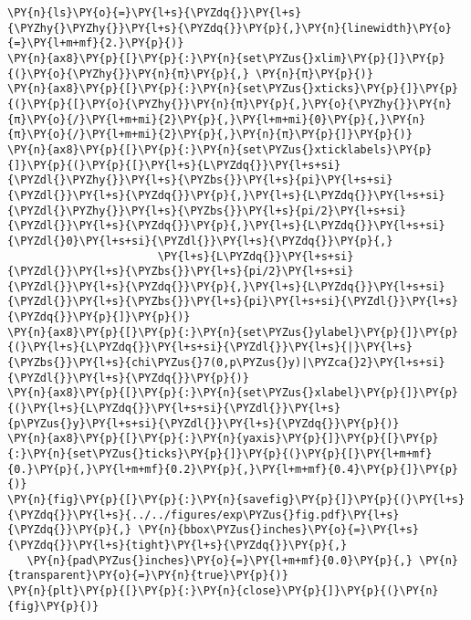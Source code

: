 \begin{Verbatim}[commandchars=\\\{\}]
           \PY{n}{ls}\PY{o}{=}\PY{l+s}{\PYZdq{}}\PY{l+s}{\PYZhy{}\PYZhy{}}\PY{l+s}{\PYZdq{}}\PY{p}{,}\PY{n}{linewidth}\PY{o}{=}\PY{l+m+mf}{2.}\PY{p}{)}
\PY{n}{ax8}\PY{p}{[}\PY{p}{:}\PY{n}{set\PYZus{}xlim}\PY{p}{]}\PY{p}{(}\PY{o}{\PYZhy{}}\PY{n}{π}\PY{p}{,} \PY{n}{π}\PY{p}{)}
\PY{n}{ax8}\PY{p}{[}\PY{p}{:}\PY{n}{set\PYZus{}xticks}\PY{p}{]}\PY{p}{(}\PY{p}{[}\PY{o}{\PYZhy{}}\PY{n}{π}\PY{p}{,}\PY{o}{\PYZhy{}}\PY{n}{π}\PY{o}{/}\PY{l+m+mi}{2}\PY{p}{,}\PY{l+m+mi}{0}\PY{p}{,}\PY{n}{π}\PY{o}{/}\PY{l+m+mi}{2}\PY{p}{,}\PY{n}{π}\PY{p}{]}\PY{p}{)}
\PY{n}{ax8}\PY{p}{[}\PY{p}{:}\PY{n}{set\PYZus{}xticklabels}\PY{p}{]}\PY{p}{(}\PY{p}{[}\PY{l+s}{L\PYZdq{}}\PY{l+s+si}{\PYZdl{}\PYZhy{}}\PY{l+s}{\PYZbs{}}\PY{l+s}{pi}\PY{l+s+si}{\PYZdl{}}\PY{l+s}{\PYZdq{}}\PY{p}{,}\PY{l+s}{L\PYZdq{}}\PY{l+s+si}{\PYZdl{}\PYZhy{}}\PY{l+s}{\PYZbs{}}\PY{l+s}{pi/2}\PY{l+s+si}{\PYZdl{}}\PY{l+s}{\PYZdq{}}\PY{p}{,}\PY{l+s}{L\PYZdq{}}\PY{l+s+si}{\PYZdl{}0}\PY{l+s+si}{\PYZdl{}}\PY{l+s}{\PYZdq{}}\PY{p}{,}
                       \PY{l+s}{L\PYZdq{}}\PY{l+s+si}{\PYZdl{}}\PY{l+s}{\PYZbs{}}\PY{l+s}{pi/2}\PY{l+s+si}{\PYZdl{}}\PY{l+s}{\PYZdq{}}\PY{p}{,}\PY{l+s}{L\PYZdq{}}\PY{l+s+si}{\PYZdl{}}\PY{l+s}{\PYZbs{}}\PY{l+s}{pi}\PY{l+s+si}{\PYZdl{}}\PY{l+s}{\PYZdq{}}\PY{p}{]}\PY{p}{)}
\PY{n}{ax8}\PY{p}{[}\PY{p}{:}\PY{n}{set\PYZus{}ylabel}\PY{p}{]}\PY{p}{(}\PY{l+s}{L\PYZdq{}}\PY{l+s+si}{\PYZdl{}}\PY{l+s}{|}\PY{l+s}{\PYZbs{}}\PY{l+s}{chi\PYZus{}7(0,p\PYZus{}y)|\PYZca{}2}\PY{l+s+si}{\PYZdl{}}\PY{l+s}{\PYZdq{}}\PY{p}{)}
\PY{n}{ax8}\PY{p}{[}\PY{p}{:}\PY{n}{set\PYZus{}xlabel}\PY{p}{]}\PY{p}{(}\PY{l+s}{L\PYZdq{}}\PY{l+s+si}{\PYZdl{}}\PY{l+s}{p\PYZus{}y}\PY{l+s+si}{\PYZdl{}}\PY{l+s}{\PYZdq{}}\PY{p}{)}
\PY{n}{ax8}\PY{p}{[}\PY{p}{:}\PY{n}{yaxis}\PY{p}{]}\PY{p}{[}\PY{p}{:}\PY{n}{set\PYZus{}ticks}\PY{p}{]}\PY{p}{(}\PY{p}{[}\PY{l+m+mf}{0.}\PY{p}{,}\PY{l+m+mf}{0.2}\PY{p}{,}\PY{l+m+mf}{0.4}\PY{p}{]}\PY{p}{)}
\PY{n}{fig}\PY{p}{[}\PY{p}{:}\PY{n}{savefig}\PY{p}{]}\PY{p}{(}\PY{l+s}{\PYZdq{}}\PY{l+s}{../../figures/exp\PYZus{}fig.pdf}\PY{l+s}{\PYZdq{}}\PY{p}{,} \PY{n}{bbox\PYZus{}inches}\PY{o}{=}\PY{l+s}{\PYZdq{}}\PY{l+s}{tight}\PY{l+s}{\PYZdq{}}\PY{p}{,}
   \PY{n}{pad\PYZus{}inches}\PY{o}{=}\PY{l+m+mf}{0.0}\PY{p}{,} \PY{n}{transparent}\PY{o}{=}\PY{n}{true}\PY{p}{)}
\PY{n}{plt}\PY{p}{[}\PY{p}{:}\PY{n}{close}\PY{p}{]}\PY{p}{(}\PY{n}{fig}\PY{p}{)}
\end{Verbatim}

